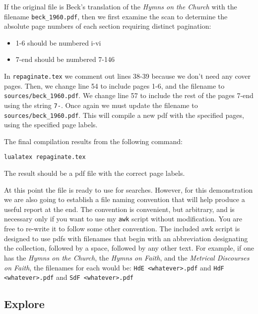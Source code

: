 \documentclass[
  letterpaper,
]{tufte-handout}
\providecommand{\tightlist}{%
  \setlength{\itemsep}{0pt}\setlength{\parskip}{0pt}}
\begin{document}
If the original file is Beck's translation of the \emph{Hymns on the
Church} with the filename \texttt{beck_1960.pdf}, then we
first examine the scan to determine the absolute page numbers of each
section requiring distinct pagination:

\begin{itemize}
\tightlist
\item
  1-6 should be numbered i-vi
\item
  7-end should be numbered 7-146
\end{itemize}

In \texttt{repaginate.tex} we comment out lines 38-39
because we don't need any cover pages. Then, we change line 54 to
include pages 1-6, and the filename to
\texttt{sources/beck_1960.pdf}. We change line 57 to
include the rest of the pages 7-end using the string
\texttt{7-}. Once again we must update the filename to
\texttt{sources/beck_1960.pdf}. This will compile a new pdf
with the specified pages, using the specified page labels.

The final compilation results from the following command:

\begin{verbatim}
lualatex repaginate.tex
\end{verbatim}

The result should be a pdf file with the correct page labels.

At this point the file is ready to use for searches. However, for this
demonstration we are also going to establish a file naming convention
that will help produce a useful report at the end. The convention is
convenient, but arbitrary, and is necessary only if you want to use my
\texttt{awk} script without modification. You are free to
re-write it to follow some other convention. The included awk script is
designed to use pdfs with filenames that begin with an abbreviation
designating the collection, followed by a space, followed by any other
text. For example, if one has the \emph{Hymns on the Church}, the
\emph{Hymns on Faith}, and the \emph{Metrical Discourses on Faith}, the
filenames for each would be: \texttt{HdE <whatever>.pdf}
and \texttt{HdF <whatever>.pdf} and
\texttt{SdF <whatever>.pdf}

\subsection{Explore}\label{explore}
\end{document}

